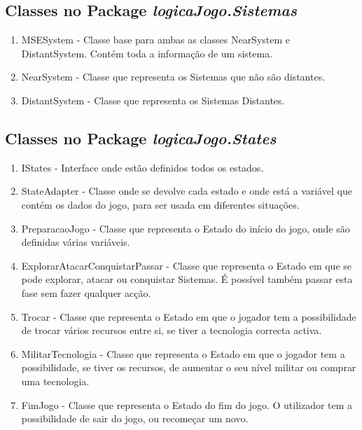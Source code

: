 \documentclass[12pt,a4paper]{article}
\begin{document}
\newpage\noindent

\subsection{Classes no Package \textit{logicaJogo.Sistemas}}

\begin{enumerate}
\item MSESystem - Classe base para ambas as classes NearSystem e DistantSystem. Contém toda a informação de um sistema.
\item NearSystem - Classe que representa os Sistemas que não são distantes.
\item DistantSystem - Classe que representa os Sistemas Distantes.
\end{enumerate}

\newpage\noindent

\subsection{Classes no Package \textit{logicaJogo.States}}

\begin{enumerate}
\item IStates - Interface onde estão definidos todos os estados.
\item StateAdapter - Classe onde se devolve cada estado e onde está a variável que contém os dados do jogo, para ser usada em diferentes situações.
\item PreparacaoJogo - Classe que representa o Estado do início do jogo, onde são definidas várias variáveis.
\item ExplorarAtacarConquistarPassar - Classe que representa o Estado em que se pode explorar, atacar ou conquistar Sistemas. É possível também passar esta fase sem fazer qualquer acção.
\item Trocar - Classe que representa o Estado em que o jogador tem a possibilidade de trocar vários recursos entre si, se tiver a tecnologia correcta activa.
\item MilitarTecnologia - Classe que representa o Estado em que o jogador tem a possibilidade, se tiver os recursos, de aumentar o seu nível militar ou comprar uma tecnologia.
\item FimJogo - Classe que representa o Estado do fim do jogo. O utilizador tem a possibilidade de sair do jogo, ou recomeçar um novo.
\end{enumerate}

\newpage\noindent
\end{document}
